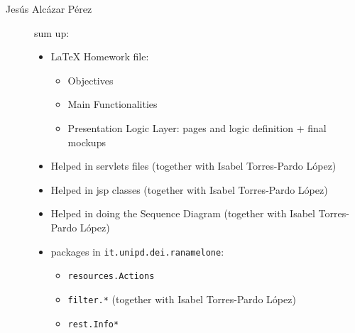 \begin{description}
    
    \item[Jesús Alcázar Pérez] sum up:
    \begin{itemize}
        \item LaTeX Homework file:
        \begin{itemize}
            \item Objectives
            \item Main Functionalities
            \item Presentation Logic Layer: pages and logic definition + final mockups
        \end{itemize}
        \item Helped in servlets files (together with Isabel Torres-Pardo López)
        \item Helped in jsp classes (together with Isabel Torres-Pardo López)
        \item Helped in doing the Sequence Diagram (together with Isabel Torres-Pardo López)
        \item packages in \verb|it.unipd.dei.ranamelone|:
        \begin{itemize}
            \item \verb|resources.Actions|
            \item \verb|filter.*| (together with Isabel Torres-Pardo López)
            \item \verb|rest.Info*| 
        \end{itemize}
    \end{itemize}
    

\end{description}
